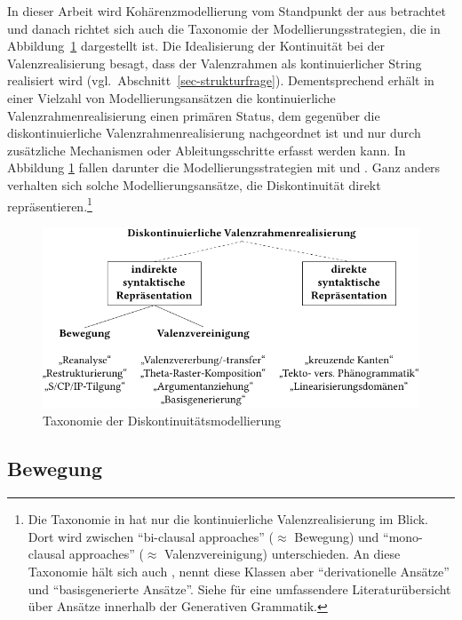 In dieser Arbeit wird Kohärenzmodellierung vom Standpunkt der  aus betrachtet und danach richtet sich auch die Taxonomie der Modellierungsstrategien, die in Abbildung~\ref{fig-kohaerenz-strategien} dargestellt ist. Die Idealisierung der Kontinuität bei der Valenzrealisierung besagt, dass der Valenzrahmen als kontinuierlicher String realisiert wird (vgl.\ Abschnitt~\ref{sec-strukturfrage}). Dementsprechend erhält in einer Vielzahl von Modellierungsansätzen die kontinuierliche Valenzrahmenrealisierung einen primären Status, dem gegenüber die diskontinuierliche Valenzrahmenrealisierung nachgeordnet ist und nur durch zusätzliche Mechanismen oder Ableitungsschritte erfasst werden kann. In Abbildung \ref{fig-kohaerenz-strategien} fallen darunter die Modellierungsstrategien mit  und . Ganz anders verhalten sich solche Modellierungsansätze, die Diskontinuität direkt repräsentieren.\footnote{Die Taxonomie in \citet[10ff]{Wurmbrand:01} hat nur die kontinuierliche Valenzrealisierung im Blick. Dort wird zwischen "`bi-clausal approaches"' ($\approx$ Bewegung) und "`mono-clausal approaches"' ($\approx$ Valenzvereinigung) unterschieden. An diese Taxonomie hält sich auch \citet[21]{Grosse:05}, nennt diese Klassen aber "`derivationelle Ansätze"' und "`basisgenerierte Ansätze"'. Siehe \cite{Wurmbrand:01} für eine umfassendere Literaturübersicht über Ansätze innerhalb der Generativen Grammatik.}

\begin{figure}
\centering
\includegraphics{graphics/abb61.pdf}
\caption{\label{fig-kohaerenz-strategien}Taxonomie der Diskontinuitätsmodellierung}
\end{figure}


\subsection{Bewegung}

